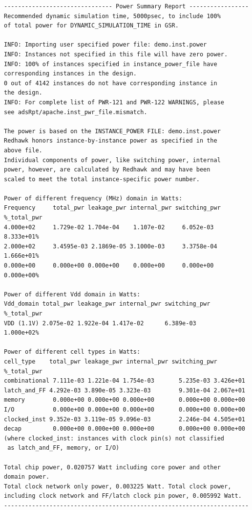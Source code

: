 \begin{lstlisting}
------------------------------- Power Summary Report -----------------
Recommended dynamic simulation time, 5000psec, to include 100%
of total power for DYNAMIC_SIMULATION_TIME in GSR.

INFO: Importing user specified power file: demo.inst.power
INFO: Instances not specified in this file will have zero power.
INFO: 100% of instances specified in instance_power_file have
corresponding instances in the design.
0 out of 4142 instances do not have corresponding instance in
the design.
INFO: For complete list of PWR-121 and PWR-122 WARNINGS, please
see adsRpt/apache.inst_pwr_file.mismatch.

The power is based on the INSTANCE_POWER FILE: demo.inst.power
Redhawk honors instance-by-instance power as specified in the
above file.
Individual components of power, like switching power, internal
power, however, are calculated by Redhawk and may have been
scaled to meet the total instance-specific power number.

Power of different frequency (MHz) domain in Watts:
Frequency     total_pwr leakage_pwr internal_pwr switching_pwr %_total_pwr
4.000e+02     1.729e-02 1.704e-04    1.107e-02     6.052e-03    8.333e+01%
2.000e+02     3.4595e-03 2.1869e-05 3.1000e-03     3.3758e-04   1.666e+01%
0.000e+00     0.000e+00 0.000e+00    0.000e+00     0.000e+00    0.000e+00%

Power of different Vdd domain in Watts:
Vdd_domain total_pwr leakage_pwr internal_pwr switching_pwr %_total_pwr
VDD (1.1V) 2.075e-02 1.922e-04 1.417e-02      6.389e-03      1.000e+02%

Power of different cell types in Watts:
cell_type    total_pwr leakage_pwr internal_pwr switching_pwr %_total_pwr
combinational 7.111e-03 1.221e-04 1.754e-03       5.235e-03 3.426e+01
latch_and_FF 4.292e-03 3.890e-05 3.323e-03        9.301e-04 2.067e+01
memory        0.000e+00 0.000e+00 0.000e+00       0.000e+00 0.000e+00
I/O           0.000e+00 0.000e+00 0.000e+00       0.000e+00 0.000e+00
clocked_inst 9.352e-03 3.119e-05 9.096e-03        2.246e-04 4.505e+01
decap         0.000e+00 0.000e+00 0.000e+00       0.000e+00 0.000e+00
(where clocked_inst: instances with clock pin(s) not classified
 as latch_and_FF, memory, or I/O)

Total chip power, 0.020757 Watt including core power and other
domain power.
Total clock network only power, 0.003225 Watt. Total clock power,
including clock network and FF/latch clock pin power, 0.005992 Watt.
----------------------------------------------------------------------
\end{lstlisting}


